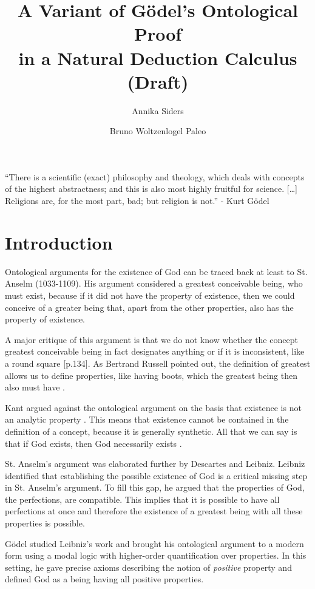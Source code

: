 \documentclass{llncs}
\title{A Variant of G\"{o}del's Ontological Proof \\
in a Natural Deduction Calculus \\
(Draft)}
\author{Annika Siders\inst{1} \and Bruno Woltzenlogel Paleo\inst{2}}
\institute{
  Helsinki, Finland\\
  \email{annika.siders@helsinki.fi}
  \and 
  Vienna, Austria \\
  \email{bruno@logic.at}
}
\begin{document}
\maketitle

\newcommand{\ess}[2]{#1 \ \mathit{ess} \ #2}
\newcommand{\NE}{E}


\noindent
``There is a scientific (exact) philosophy and theology,
which deals with concepts of the highest abstractness; and this is also most highly fruitful for science. [\ldots] Religions are, for the most part, bad; but religion is not.'' - Kurt G\"{o}del

\section{Introduction}

Ontological arguments for the existence of God can be traced back at least to St. Anselm (1033-1109). His argument considered a greatest conceivable being, who must exist, because if it did not have the property of existence, then we could conceive of a greater being that, apart from the other properties, also has the property of existence. 

A major critique of this argument is that we do not know whether the concept greatest conceivable being in fact designates anything or if it is inconsistent, like a round square \citep{fitting}[p.134].  
As Bertrand Russell pointed out, the definition of greatest allows us to define properties, like having boots, which the greatest being then also must have \citep{citation needed}. 

Kant argued against the ontological argument on the basis that existence is not an analytic property \citep{kant}. This means that existence cannot be contained in the definition of a concept, because it is generally synthetic. All that we can say is that if God exists, then God necessarily exists \citep{citation needed}.

St. Anselm's argument was elaborated further by Descartes and Leibniz. Leibniz identified that establishing the possible existence of God is a critical missing step in St. Anselm's argument. To fill this gap, he argued that the properties of God, the perfections, are compatible. This implies that it is possible to have all perfections at once and therefore the existence of a greatest being with all these properties is possible. 

G\"odel studied Leibniz's work \citep{Adams} and brought his ontological argument to a modern form using a modal logic with higher-order quantification over properties. In this setting, he gave precise axioms describing the notion of \emph{positive} property and defined God as a being having all positive properties. 
\end{document}
